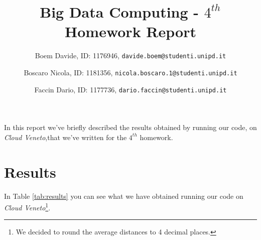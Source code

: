 \documentclass[10pt]{article}
\begin{document}
 
 
 
\title{Big Data Computing - $4^{th}$ Homework Report}
\author{Boem Davide, ID: 1176946, \texttt{davide.boem@studenti.unipd.it} \and Boscaro Nicola, ID: 1181356, \texttt{nicola.boscaro.1@studenti.unipd.it} \and Faccin Dario, ID: 1177736, \texttt{dario.faccin@studenti.unipd.it}}
\date{}
 
\maketitle


In this report we've briefly described the results obtained by running our code, on \textit{Cloud Veneto},that we've written for the $4^{th}$ homework.

\section{Results}

In Table \ref{tab:results} you can see what we have obtained running our code on \textit{Cloud Veneto}\footnote{We decided to round the average distances to 4 decimal places.}.
\end{document}
